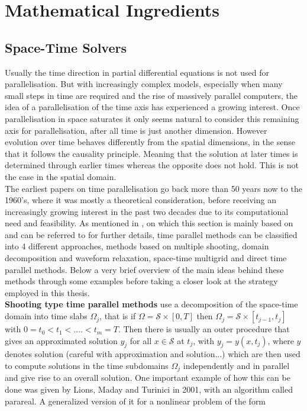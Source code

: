 \documentclass[../draft_1.tex]{subfiles}
\begin{document}
\chapter{Mathematical Ingredients}
\section{Space-Time Solvers}

Usually the time direction in partial differential equations is not used for parallelisation. But with increasingly complex models, especially when many small steps in time are required and the rise of massively parallel computers, the idea of a parallelisation of the time axis has experienced a growing interest. Once parallelisation in space saturates it only seems natural to consider this remaining axis for parallelisation, after all time is just another dimension. However evolution over time behaves differently from the spatial dimensions, in the sense that it follows the causality principle. Meaning that the solution at later times is determined through earlier times whereas the opposite does not hold. This is not the case in the spatial domain. 
\smallskip
\\ 
The earliest papers on time parallelisation go back more than 50 years now to the 1960's, where it was mostly a theoretical consideration, before receiving an increasingly growing interest in the past two decades due to its computational need and feasibility. As mentioned in \cite{gander201550}, on which this section is mainly based on and can be referred to for further details, time parallel methods can be classified into 4 different approaches, methods based on multiple shooting, domain decomposition and waveform relaxation, space-time multigrid and direct time parallel methods. Below a very brief overview of the main ideas behind these methods through some examples before taking a closer look at the strategy employed in this thesis. 
\smallskip
\\
\textbf{Shooting type time parallel methods} use a decomposition of the space-time domain into time slabs $\Omega_j$, that is if $\Omega = \mathcal{S} \times [0, T]$ then $ \Omega_j =  \mathcal{S} \times [t_{j-1}, t_j]$ with $0 = t_0 < t_1 < .... < t_m = T$. Then there is usually an outer procedure that gives an approximated solution $y_j$ for all $ x \in \mathcal{S}$ at $t_j$, with $y_j = y(x, t_j)$, where $y$ denotes solution (careful with approximation and solution...) which are then used to compute solutions in the time subdomains $\Omega_j$ independently and in parallel and give rise to an overall solution. One important example of how this can be done was given by Lions, Maday and Turinici in 2001, with an algorithm called parareal. A generalized version of it for a nonlinear problem of the form
\end{document}
